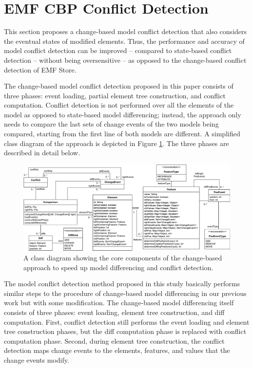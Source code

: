 \section{EMF CBP Conflict Detection}
\label{sec:emf_cbp_conflict_detection}
This section proposes a change-based model conflict detection that also considers the eventual states of modified elements. Thus, the performance and accuracy of model conflict detection can be improved -- compared to state-based conflict detection -- without being oversensitive -- as opposed to the change-based conflict detection of EMF Store.

The change-based model conflict detection proposed in this paper consists of three phases: event loading, partial element tree construction, and conflict computation. Conflict detection is not performed over all the elements of the model as opposed to state-based model differencing; instead, the approach only needs to compare the last sets of change events of the two models being compared, starting from the first line of both models are different. A simplified class diagram of the approach \cite{epsilonlabs2019emfcbp} is depicted in Figure \ref{fig:approach_class_diagram}. The three phases are described in detail below.

\begin{figure}
  \includegraphics[width=\linewidth]{TreeClassDiagram}
  \caption{A class diagram showing the core components of the change-based approach to speed up model differencing and conflict detection.}
  \label{fig:approach_class_diagram}
\end{figure}

The model conflict detection method proposed in this study basically performs similar steps to the procedure of change-based model differencing in our previous work \cite{yohannis2019efficient} but with some modification. The change-based model differencing itself consists of three phases: event loading, element tree construction, and diff computation. First, conflict detection still performs the event loading and element tree construction phases, but the diff computation phase is replaced with conflict computation phase. Second, during element tree construction, the conflict detection maps change events to the elements, features, and values that the change events modify. 

